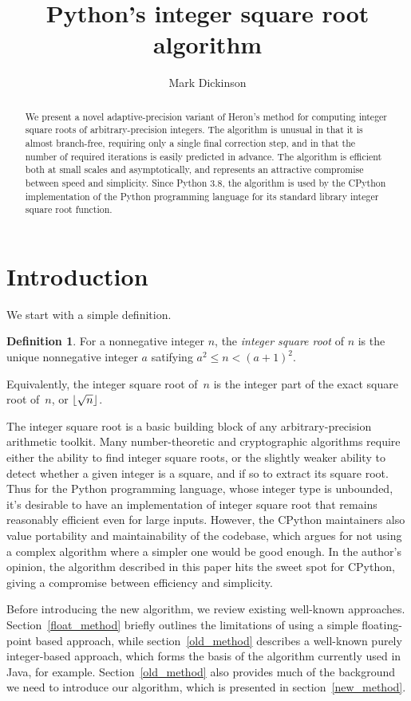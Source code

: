 \documentclass[a4paper]{article}
\title{Python's integer square root algorithm}
\author{Mark Dickinson}
\DeclarePairedDelimiter\floor{\lfloor}{\rfloor}
\theoremstyle{plain}
\theoremstyle{definition}
\newtheorem{definition}[theorem]{Definition}
\begin{document}
\lstset{language=Python}
\maketitle
\begin{abstract}
We present a novel adaptive-precision variant of Heron's method for computing
integer square roots of arbitrary-precision integers. The algorithm is unusual
in that it is almost branch-free, requiring only a single final correction
step, and in that the number of required iterations is easily predicted in
advance. The algorithm is efficient both at small scales and asymptotically,
and represents an attractive compromise between speed and simplicity. Since
Python 3.8, the algorithm is used by the CPython implementation of the Python
programming language for its standard library integer square root function.
\end{abstract}
\section{Introduction}

We start with a simple definition.

\begin{definition}
  For a nonnegative integer $n$, the \emph{integer square root} of $n$ is
  the unique nonnegative integer $a$ satifying $a^2 \le n < (a + 1)^2$.
\end{definition}

Equivalently, the integer square root of~$n$ is the integer part of the exact
square root of~$n$, or $\floor{\sqrt n}$.

The integer square root is a basic building block of any arbitrary-precision
arithmetic toolkit. Many number-theoretic and cryptographic algorithms require
either the ability to find integer square roots, or the slightly weaker ability
to detect whether a given integer is a square, and if so to extract its square
root. Thus for the Python programming language, whose integer type is
unbounded, it's desirable to have an implementation of integer square root that
remains reasonably efficient even for large inputs. However, the CPython
maintainers also value portability and maintainability of the codebase, which
argues for not using a complex algorithm where a simpler one would be good
enough. In the author's opinion, the algorithm described in this paper hits the
sweet spot for CPython, giving a compromise between efficiency and simplicity.

Before introducing the new algorithm, we review existing well-known approaches.
Section~\ref{float_method} briefly outlines the limitations of using a simple
floating-point based approach, while section~\ref{old_method} describes a
well-known purely integer-based approach, which forms the basis of the
algorithm currently used in Java, for example. Section~\ref{old_method} also
provides much of the background we need to introduce our algorithm, which is
presented in section~\ref{new_method}.
\end{document}
